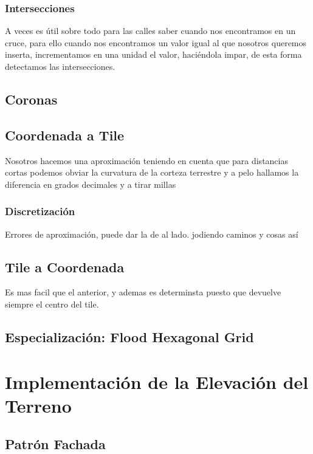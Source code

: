 \subsubsection*{Intersecciones}
A veces es útil sobre todo para las calles saber cuando nos encontramos en un
cruce, para ello cuando nos encontramos un valor igual al que nosotros queremos
inserta, incrementamos en una unidad el valor, haciéndola impar, de esta forma
detectamos las intersecciones.
\subsection*{Coronas}
\subsection*{Coordenada a Tile}
Nosotros hacemos una aproximación teniendo en cuenta que para distancias cortas
podemos obviar la curvatura de la corteza terrestre y a pelo hallamos la
diferencia en grados decimales y a tirar millas
\subsubsection*{Discretización}
Errores de aproximación, puede dar la de al lado. jodiendo caminos y cosas así
\subsection*{Tile a Coordenada}
Es mas facil que el anterior, y ademas es determinsta puesto que devuelve
siempre el centro del tile.
\subsection*{Especialización: Flood Hexagonal Grid}
\section*{Implementación de la Elevación del Terreno}
\subsection*{Patrón Fachada}
